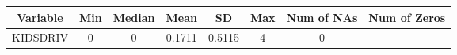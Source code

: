 \documentclass[]{article}
\begin{document}
\begin{longtable}[]{@{}cccccccc@{}}
\toprule
\begin{minipage}[b]{0.11\columnwidth}\centering\strut
Variable\strut
\end{minipage} & \begin{minipage}[b]{0.07\columnwidth}\centering\strut
Min\strut
\end{minipage} & \begin{minipage}[b]{0.09\columnwidth}\centering\strut
Median\strut
\end{minipage} & \begin{minipage}[b]{0.09\columnwidth}\centering\strut
Mean\strut
\end{minipage} & \begin{minipage}[b]{0.09\columnwidth}\centering\strut
SD\strut
\end{minipage} & \begin{minipage}[b]{0.09\columnwidth}\centering\strut
Max\strut
\end{minipage} & \begin{minipage}[b]{0.13\columnwidth}\centering\strut
Num of NAs\strut
\end{minipage} & \begin{minipage}[b]{0.14\columnwidth}\centering\strut
Num of Zeros\strut
\end{minipage}\tabularnewline
\midrule
\endhead
\begin{minipage}[t]{0.11\columnwidth}\centering\strut
KIDSDRIV\strut
\end{minipage} & \begin{minipage}[t]{0.07\columnwidth}\centering\strut
0\strut
\end{minipage} & \begin{minipage}[t]{0.09\columnwidth}\centering\strut
0\strut
\end{minipage} & \begin{minipage}[t]{0.09\columnwidth}\centering\strut
0.1711\strut
\end{minipage} & \begin{minipage}[t]{0.09\columnwidth}\centering\strut
0.5115\strut
\end{minipage} & \begin{minipage}[t]{0.09\columnwidth}\centering\strut
4\strut
\end{minipage} & \begin{minipage}[t]{0.13\columnwidth}\centering\strut
0\strut
\end{minipage} & \begin{minipage}[t]{0.14\columnwidth}\centering\strut

\end{minipage}
\end{longtable}
\end{document}
